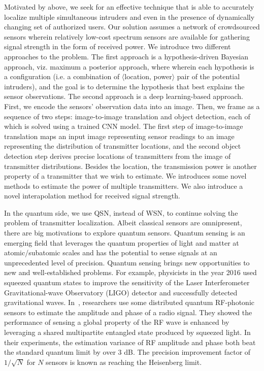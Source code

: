 Motivated by above, we seek for an effective technique that is able to accurately localize multiple simultaneous
intruders and even in the presence of dynamically changing set of authorized users.
Our solution assumes a network of crowdsourced sensors wherein relatively low-cost spectrum sensors are available
for gathering signal strength in the form of received power.
We introduce two different approaches to the \mtl problem.
The first approach is a hypothesis-driven Bayesian approach, viz. maximum a posterior approach, where wherein each hypothesis is a configuration
(i.e. a combination of $\langle$location, power$\rangle$ pair of the potential intruders), and the goal is to determine the hypothesis 
that best explains the sensor observations.
The second approach is a deep learning-based approach. First, we encode the sensors' observation data into an image.
Then, we frame \mtl as a sequence of two steps: image-to-image translation 
and object detection, each of which is solved using a trained CNN model. 
The first step of image-to-image translation maps an input image representing sensor readings to an image
representing the distribution of transmitter locations, and the second object detection step derives precise locations of
transmitters from the image of transmitter distributions. 
Besides the location, the transmission power is another property of a transmitter that we wish to estimate.
We introduces some novel methods to estimate the power of multiple transmitters.
We also introduce a novel interapolation method for received signal strength.


In the quantum side, we use QSN, instead of WSN, to continue solving the problem of transmitter localization.
Albeit classical sensors are omnipresent, there are big motivations to explore quantum sensors.
Quantum sensing is an emerging field that leverages the quantum properties of light and matter at atomic/subatomic scales and has the potential to sense signals at an unprecedented level of precision.
Quantum sensing brings new opportunities to new and well-established problems.
For example, physicists in the year 2016 used squeezed quantum states to improve the sensitivity of the Laser Interferometer Gravitational-wave Observatory (LIGO) detector and successfully detected gravitational waves.
In~\cite{PRL20-qsn}, researchers use some distributed quantum RF-photonic sensors to estimate the amplitude and phase of a radio signal.
They showed the performance of sensing a global property of the RF wave is enhanced by leveraging a shared multipartite entangled state produced by squeezed light.
In their experiments, the estimation variance of RF amplitude and phase both beat the standard quantum limit by over 3 dB.
The precision improvement factor of $1/\sqrt{N}$ for $N$ sensors is known as reaching the Heisenberg limit.

